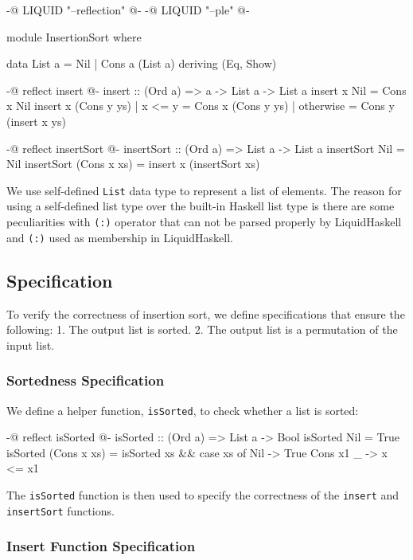 \documentclass[]{rptuseminar}
\begin{document}
\begin{haskell}
{-@ LIQUID "--reflection" @-}
{-@ LIQUID "--ple" @-}

module InsertionSort where

data List a = Nil | Cons a (List a) deriving (Eq, Show)

{-@ reflect insert @-}
insert :: (Ord a) => a -> List a -> List a
insert x Nil = Cons x Nil
insert x (Cons y ys)
  | x <= y    = Cons x (Cons y ys)
  | otherwise = Cons y (insert x ys)

{-@ reflect insertSort @-}
insertSort :: (Ord a) => List a -> List a
insertSort Nil = Nil
insertSort (Cons x xs) = insert x (insertSort xs)
\end{haskell}

We use self-defined \texttt{List} data type to represent a list of elements.
The reason for using a self-defined list type over the built-in Haskell list type is there are some peculiarities with
\texttt{(:)} operator that can not be parsed properly by LiquidHaskell and \texttt{(:)} used as membership in LiquidHaskell.
\subsection{Specification}

To verify the correctness of insertion sort, we define specifications that ensure the following:
1. The output list is sorted.
2. The output list is a permutation of the input list.

\subsubsection{Sortedness Specification}

We define a helper function, \texttt{isSorted}, to check whether a list is sorted:

\begin{haskell}
{-@ reflect isSorted @-}
isSorted :: (Ord a) => List a -> Bool
isSorted Nil = True
isSorted (Cons x xs) =
  isSorted xs && case xs of
    Nil        -> True
    Cons x1 _  -> x <= x1
\end{haskell}

The \texttt{isSorted} function is then used to specify the correctness of the \texttt{insert} and \texttt{insertSort} functions.

\subsubsection{Insert Function Specification}
\end{document}
